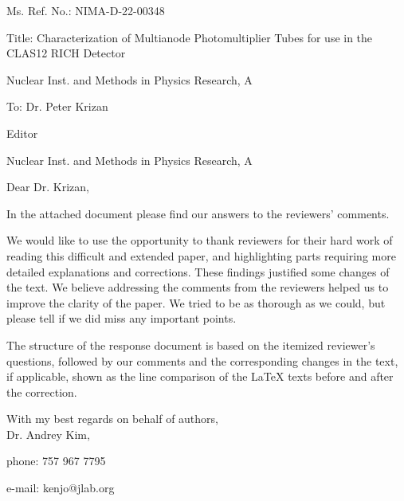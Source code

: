 \documentclass[final,3p,times]{elsarticle}
\begin{document}
Ms. Ref. No.:  NIMA-D-22-00348

Title: Characterization of Multianode Photomultiplier Tubes for use in the CLAS12 RICH Detector

Nuclear Inst. and Methods in Physics Research, A
\newline
\newline
\newline

To: Dr. Peter Krizan

Editor

Nuclear Inst. and Methods in Physics Research, A
\newline
\newline
\newline

Dear Dr. Krizan,
\newline

In the attached document please find our answers to the reviewers' comments.

We would like to use the opportunity to thank reviewers for their hard work of reading this difficult and extended paper, and highlighting parts requiring more detailed explanations and corrections. These findings justified some changes of the text. We believe addressing the comments from the reviewers helped us to improve the clarity of the paper. We tried to be as thorough as we could, but please tell if we did miss any important points.

The structure of the response document is based on the itemized reviewer's questions, followed by our comments and the corresponding changes in the text, if applicable, shown as the line comparison of the LaTeX texts before and after the correction. 
\newline

With my best regards on behalf of authors,\\

Dr. Andrey Kim,

phone: 757 967 7795

e-mail: kenjo@jlab.org
\end{document}
